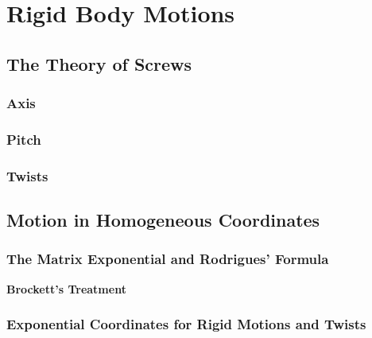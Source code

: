 \chapter{Rigid Body Motions}
\label{sec:rig_bod_mot}

\section{The Theory of Screws}

\subsection{Axis}

\subsection{Pitch}

\subsection{Twists}

\section{Motion in Homogeneous Coordinates}

\subsection{The Matrix Exponential and Rodrigues' Formula}

\noindent \textbf{Brockett's Treatment}

\subsection{Exponential Coordinates for Rigid Motions and Twists}